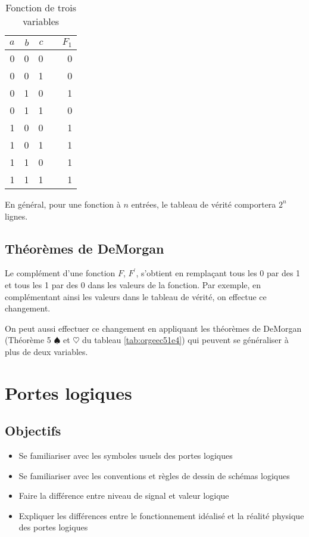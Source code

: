 \documentclass[letter, oneside]{book}
\begin{document}
\begin{enumerate}
\begin{table}[htbp]
\caption{\label{tab:orgbbfc355}Fonction de trois variables}
\centering
\begin{tabular}{rrrlr}
\(a\) & \(b\) & \(c\) &  & \(F_1\)\\[0pt]
\hline
0 & 0 & 0 &  & 0\\[0pt]
0 & 0 & 1 &  & 0\\[0pt]
0 & 1 & 0 &  & 1\\[0pt]
0 & 1 & 1 &  & 0\\[0pt]
1 & 0 & 0 &  & 1\\[0pt]
1 & 0 & 1 &  & 1\\[0pt]
1 & 1 & 0 &  & 1\\[0pt]
1 & 1 & 1 &  & 1\\[0pt]
\end{tabular}
\end{table}

En général, pour une fonction à \(n\) entrées, le tableau de vérité
comportera \(2^n\) lignes.
\end{enumerate}

\section{Théorèmes de DeMorgan}
\label{sec:org94d3bc7}

Le complément d'une fonction \(F\), \(F^\prime\), s'obtient en
remplaçant tous les 0 par des 1 et tous les 1 par des 0 dans les
valeurs de la fonction. Par exemple, en complémentant ainsi les
valeurs dans le tableau de vérité, on effectue ce changement.

On peut aussi effectuer ce changement en appliquant les théorèmes de
DeMorgan (Théorème 5 \(\spadesuit\) et \(\heartsuit\) du tableau \ref{tab:orgeec51e4}) qui
peuvent se généraliser à plus de deux variables.

\chapter{Portes logiques}
\label{sec:orgb12d442}

\section{Objectifs}
\label{sec:org80d8fab}
\begin{itemize}
\item Se familiariser avec les symboles usuels des portes logiques
\item Se familiariser avec les conventions et règles de dessin de schémas
logiques
\item Faire la différence entre niveau de signal et valeur logique
\item Expliquer les différences entre le fonctionnement idéalisé
et la réalité physique des portes logiques
\end{itemize}
\end{document}
